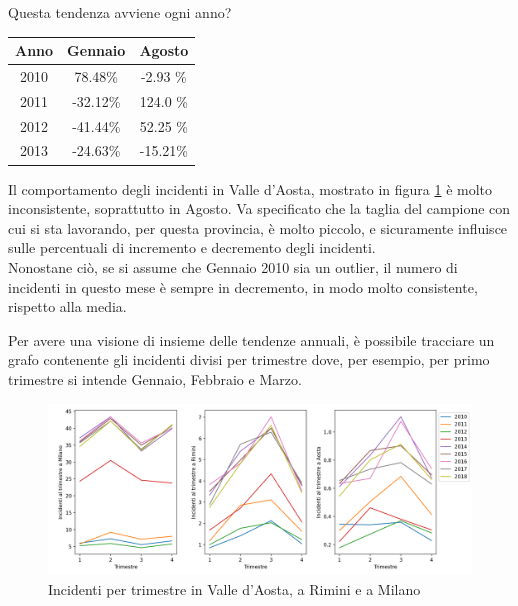 \documentclass[a4paper]{report}
\begin{document}
Questa tendenza avviene ogni anno?

\begin{center}
    \def\arraystretch{1.5}%
    \begin{tabular}{ |c|c|c| } 
    \hline
    Anno & Gennaio & Agosto \\ 
    \hline
    \rowcolor{TableGray}
    2010 & 78.48\%  & -2.93 \%\\ 
    2011 & -32.12\% & 124.0 \%\\
    \rowcolor{TableGray}
    2012 & -41.44\% & 52.25 \% \\
    2013 & -24.63\% & -15.21\% \\
    \hline
    \end{tabular}
\end{center}

Il comportamento degli incidenti in Valle d'Aosta, mostrato in figura 
\ref{fig:aosta-rimini-milano-trimestre} è molto inconsistente, soprattutto in Agosto.
Va specificato che la taglia del campione con cui si sta lavorando, per questa provincia, 
è molto piccolo, e sicuramente influisce sulle percentuali di incremento e decremento 
degli incidenti.\\
Nonostane ciò, se si assume che Gennaio 2010 sia un outlier, il numero di incidenti in 
questo mese è sempre in decremento, in modo molto consistente, rispetto alla media.

Per avere una visione di insieme delle tendenze annuali, è possibile tracciare 
un grafo contenente gli incidenti divisi per trimestre dove, per esempio, 
per primo trimestre si intende Gennaio, Febbraio e Marzo.

\begin{figure}
    \includegraphics[width=\linewidth]{../src/incidenti/incidenti_senza_coords/mese_incidenti/trimestri_aosta_milano_rimini.png}
    \caption{Incidenti per trimestre in Valle d'Aosta, a Rimini e a Milano}
    \label{fig:aosta-rimini-milano-trimestre}
\end{figure}
\end{document}
